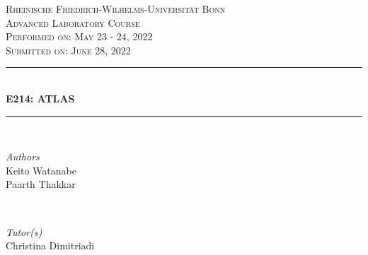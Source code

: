\documentclass[a4paper]{report}
\numberwithin{equation}{section}
\begin{document}
\begin{titlepage} %
	\newcommand{\HRule}{\rule{\linewidth}{0.5mm}} %
	
	\center %
	
	\textsc{\LARGE Rheinische Friedrich-Wilhelms-Universit\"at Bonn }\\[4cm] %
	
	\textsc{\Large Advanced Laboratory Course}\\[0.5cm] %
	
	\textsc{\large Performed on: May 23 - 24, 2022}\\[0.5cm] %

	\textsc{\large Submitted on: June 28, 2022}\\[0.5cm] %
	
	
	\HRule\\[0.4cm]
	
	{\huge\bfseries E214: ATLAS}\\[0.4cm] %
	
	\HRule\\[1.5cm]
	
	
	\begin{minipage}{0.4\textwidth}
		\begin{flushleft}
			\large
			\textit{Authors}\\
			Keito Watanabe \\
			Paarth Thakkar
		\end{flushleft}
	\end{minipage}
	~
	\begin{minipage}{0.4\textwidth}
		\begin{flushright}
			\large
			\textit{Tutor(s)}\\
			Christina Dimitriadi
		\end{flushright}
	\end{minipage}


\end{titlepage}
\end{document}

